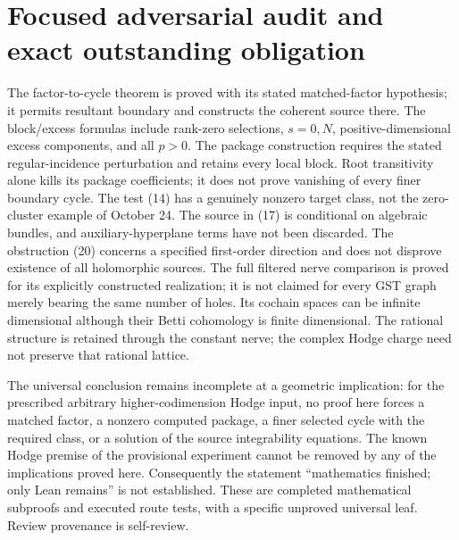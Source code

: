 \documentclass[11pt]{article}
\begin{document}
\section{Focused adversarial audit and exact outstanding obligation}
The factor-to-cycle theorem is proved with its stated matched-factor
hypothesis; it permits resultant boundary and constructs the coherent
source there. The block/excess formulas include rank-zero selections,
$s=0,N$, positive-dimensional excess components, and all $p>0$.
The package construction requires the stated regular-incidence perturbation
and retains every local block. Root transitivity alone kills its package
coefficients; it does not prove vanishing of every finer boundary cycle.
The test (14) has a genuinely nonzero target class, not the zero-cluster
example of October 24. The source in (17) is conditional on algebraic
bundles, and auxiliary-hyperplane terms have not been discarded.
The obstruction (20) concerns a specified first-order direction and does
not disprove existence of all holomorphic sources.
The full filtered nerve comparison is proved for its explicitly constructed
realization; it is not claimed for every GST graph merely bearing the same
number of holes. Its cochain spaces can be infinite dimensional although
their Betti cohomology is finite dimensional. The rational structure is
retained through the constant nerve; the complex Hodge charge need not
preserve that rational lattice.

The universal conclusion remains incomplete at a geometric implication:
for the prescribed arbitrary higher-codimension Hodge input, no proof here
forces a matched factor, a nonzero computed package, a finer selected
cycle with the required class, or a solution of the source integrability
equations. The known Hodge premise of the provisional experiment cannot
be removed by any of the implications proved here. Consequently the
statement ``mathematics finished; only Lean remains'' is not established.
These are completed mathematical subproofs and executed route tests,
with a specific unproved universal leaf. Review provenance is self-review.
\end{document}

